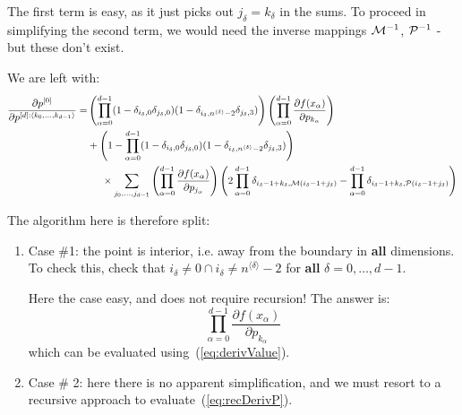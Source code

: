 \documentclass[11pt]{article}
\begin{document}
The first term is easy, as it just picks out $j_\delta = k_\delta$ in the sums. To proceed in simplifying the second term, we would need the inverse mappings ${\cal M}^{-1}$, ${\cal P}^{-1}$ - but these don't exist. 

We are left with:
\begin{equation}
\begin{split}	
\frac{\partial p^{[0]}}{\partial p^{[d]: \langle k_0, \dots, k_{d-1} \rangle}}
=&
\left ( \prod_{\alpha = 0}^{d-1} (1 - \delta_{i_\delta,0}\delta_{j_\delta,0}) (1 - \delta_{i_\delta,n^{\langle \delta \rangle}-2}\delta_{j_\delta,3}) \right )
\left (
\prod_{\alpha=0}^{d-1} 
\frac{
\partial f(x_\alpha)
}{
\partial p_{k_\alpha}
}
\right ) \\
&+ \left ( 1 - \prod_{\alpha = 0}^{d-1} (1 - \delta_{i_\delta,0}\delta_{j_\delta,0}) (1 - \delta_{i_\delta,n^{\langle \delta \rangle}-2}\delta_{j_\delta,3}) \right ) \\
&\hspace{5mm} \times
\sum_{j_0, \dots, j_{d-1}}
\left (
\prod_{\alpha=0}^{d-1} 
\frac{
\partial f(x_\alpha)
}{
\partial p_{j_\alpha}
}
\right ) 
\left (
2 
\prod_{\alpha=0}^{d-1} \delta_{i_\delta-1+k_\delta, {\cal M}(i_\delta-1+j_\delta) }
-
\prod_{\alpha=0}^{d-1} \delta_{i_\delta-1+k_\delta, {\cal P}(i_\delta-1+j_\delta) }
\right ) 
\end{split}
\end{equation}

The algorithm here is therefore split:
\begin{enumerate}
\item Case \#1: the point is interior, i.e. away from the boundary in \textbf{all} dimensions. To check this, check that $i_\delta \neq 0 \cap i_\delta \neq n^{\langle \delta \rangle} -2$ for \textbf{all} $\delta=0,\dots,d-1$.

Here the case easy, and does not require recursion! The answer is:
\begin{equation}
\prod_{\alpha=0}^{d-1} 
\frac{
\partial f(x_\alpha)
}{
\partial p_{k_\alpha}
}
\end{equation}
which can be evaluated using~(\ref{eq:derivValue}).

\item Case \# 2: here there is no apparent simplification, and we must resort to a recursive approach to evaluate~(\ref{eq:recDerivP}).

\end{enumerate}
\end{document}
